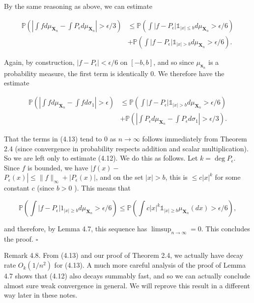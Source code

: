 \documentclass[10pt]{article}
\begin{document}
By the same reasoning as above, we can estimate

$$
\begin{aligned}
\mathbb{P}\left(\left|\int f d \mu_{\mathbf{X}_{n}}-\int P_{\epsilon} d \mu_{\mathbf{X}_{n}}\right|>\epsilon / 3\right) & \leq \mathbb{P}\left(\int\left|f-P_{\epsilon}\right| \mathbb{1}_{|x| \leq b} d \mu_{\mathbf{X}_{n}}>\epsilon / 6\right) \\
& +\mathbb{P}\left(\int\left|f-P_{\epsilon}\right| \mathbb{1}_{|x|>b} d \mu_{\mathbf{X}_{n}}>\epsilon / 6\right) .
\end{aligned}
$$

Again, by construction, $\left|f-P_{\epsilon}\right|<\epsilon / 6$ on $[-b, b]$, and so since $\mu_{\mathbf{x}_{n}}$ is a probability measure, the first term is identically 0. We therefore have the estimate


\begin{align*}
\mathbb{P}\left(\left|\int f d \mu_{\mathbf{X}_{n}}-\int f d \sigma_{1}\right|>\epsilon\right) & \leq \mathbb{P}\left(\int\left|f-P_{\epsilon}\right| \mathbb{1}_{|x|>b} d \mu_{\mathbf{X}_{n}}>\epsilon / 6\right)  \tag{4.12}\\
& +\mathbb{P}\left(\left|\int P_{\epsilon} d \mu_{\mathbf{X}_{n}}-\int P_{\epsilon} d \sigma_{1}\right|>\epsilon / 3\right) . \tag{4.13}
\end{align*}


That the terms in (4.13) tend to 0 as $n \rightarrow \infty$ follows immediately from Theorem 2.4 (since convergence in probability respects addition and scalar multiplication). So we are left only to estimate (4.12). We do this as follows. Let $k=\operatorname{deg} P_{\epsilon}$. Since $f$ is bounded, we have $\mid f(x)-$\\
$P_{\epsilon}(x)\left|\leq\|f\|_{\infty}+\left|P_{\epsilon}(x)\right|\right.$, and on the set $| x \mid>b$, this is $\leq c|x|^{k}$ for some constant $c$ (since $b>0$ ). This means that

$$
\mathbb{P}\left(\int\left|f-P_{\epsilon}\right| 1_{|x| \geq b} d \mu_{\mathbf{X}_{n}}>\epsilon / 6\right) \leq \mathbb{P}\left(\int c|x|^{k} \mathbb{1}_{|x| \geq b} \mu_{\mathbf{X}_{n}}(d x)>\epsilon / 6\right),
$$

and therefore, by Lemma 4.7, this sequence has $\limsup _{n \rightarrow \infty}=0$. This concludes the proof. \(\square\)

Remark 4.8. From (4.13) and our proof of Theorem 2.4, we actually have decay rate $O_{k}\left(1 / n^{2}\right)$ for (4.13). A much more careful analysis of the proof of Lemma 4.7 shows that (4.12) also decays summably fast, and so we can actually conclude almost sure weak convergence in general. We will reprove this result in a different way later in these notes.
\end{document}
